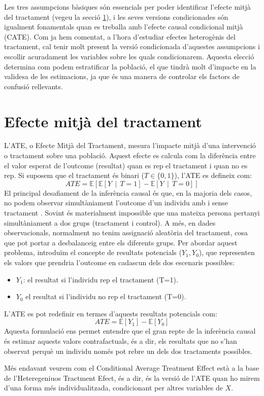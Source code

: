 \documentclass[../main.tex]{subfiles}
\begin{document}
    Les tres assumpcions bàsiques són essencials per poder identificar l’efecte mitjà del tractament (vegeu la secció \ref{sec:ate}), i les seves versions condicionades són igualment fonamentals quan es treballa amb l’efecte causal condicional mitjà (CATE). Com ja hem comentat, a l’hora d’estudiar efectes heterogènis del tractament, cal tenir molt present la versió condicionada d’aquestes assumpcions i escollir acuradament les variables sobre les quals condicionarem. Aquesta elecció determina com podem estratificar la població, el que tindrà molt d'impacte en la validesa de les estimacions, ja que és una manera de controlar els factors de confusió rellevants. \cite{hernan2020}

    \section{Efecte mitjà del tractament}\label{sec:ate}
    L’ATE, o Efecte Mitjà del Tractament, mesura l’impacte mitjà d’una intervenció o tractament sobre una població. Aquest efecte es calcula com la diferència entre el valor esperat de l'outcome (resultat) quan es rep el tractament i quan no es rep. Si suposem que el tractament és binari ($T\in\{0,1\}$), l’ATE es defineix com: \citep{hernan2020}
    \begin{equation}
        ATE=\mathbb{E}[\mathbb{E}[Y\,\mid\,T=1]-\mathbb{E}[Y\,\mid\,T=0]]
    \end{equation}
    El principal desafiament de la inferència causal és que, en la majoria dels casos, no podem observar simultàniament l'outcome d’un individu amb i sense tractament \citep{Holland1986}. Sovint és materialment impossible que una mateixa persona pertanyi simultàniament a dos grups (tractament i control). A més, en dades observacionals, normalment no tenim assignació aleatòria del tractament, cosa que pot portar a desbalanceig entre els diferents grups.
    Per abordar aquest problema, introduïm el concepte de resultats potencials ($Y_1,Y_0$), que representen els valors que prendria l'outcome en cadascun dels dos escenaris possibles:
    \begin{itemize}
        \item  $Y_1$: el resultat si l’individu rep el tractament (T=1).
        \item $Y_0$ el resultat si l’individu no rep el tractament (T=0).
    \end{itemize}
    L'ATE es pot redefinir en termes d’aquests resultats potencials com:
    \begin{equation}
        ATE=\mathbb{E}[Y_1]-\mathbb{E}[Y_0]
    \end{equation}
    Aquesta formulació ens permet entendre que el gran repte de la inferència causal és estimar aquests valors contrafactuals, és a dir, els resultats que no s'han observat perquè un individu només pot rebre un dels dos tractaments possibles.\par
    Més endavant veurem com el Conditional Average Treatment Effect està a la base de l’Heteregeniuos Tractment Efect, és a dir, és la versió de l'ATE quan ho mirem d’una forma més individualitzada, condicionant per altres variables de $X$.
\end{document}
